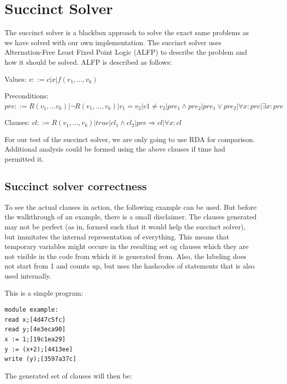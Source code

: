 \section{Succinct Solver}
The succinct solver is a blackbox approach to solve the exact same problems as we have solved with our own implementation. The succinct solver uses Alternation-Free Least Fixed Point Logic (ALFP) to describe the problem and how it should be solved. ALFP is described as follows:

Values:
$v ::= c | x | f(v_1,...,v_k)$

Preconditions:
$pre ::= R(v_1,...v_k) | \neg R(v_1,...,v_k)
      |  v_1 = v_2 | v1 \not= v_2
      |  pre_1 \wedge pre_2 | pre_1 \vee pre_2
      |  \forall x : pre | \exists x : pre$

Clauses:
$cl ::= R(v_1,...,v_k) | true | cl_1 \wedge cl_2
     |  pre \Rightarrow cl | \forall x : cl$

For our test of the succinct solver, we are only going to use RDA for comparison. Additional analysis could be formed using the above clauses if time had permitted it.

\subsection{Succinct solver correctness}
To see the actual clauses in action, the following example can be used. But before the walkthrough of an example, there is a small disclaimer. The clauses generated may not be perfect (as in, formed such that it would help the succinct solver), but immitates the internal representation of everything. This means that temporary variables might occure in the resulting set og clauses which they are not visible in the code from which it is generated from. Also, the labeling does not start from 1 and counts up, but uses the hashcodes of statements that is also used internally.

This is a simple program:
\begin{lstlisting}
module example:
read x;[4d47c5fc]
read y;[4e3eca90]
x := 1;[19c1ea29]
y := (x+2);[4413ee]
write (y);[3597a37c]
\end{lstlisting}
The generated set of clauses will then be:


